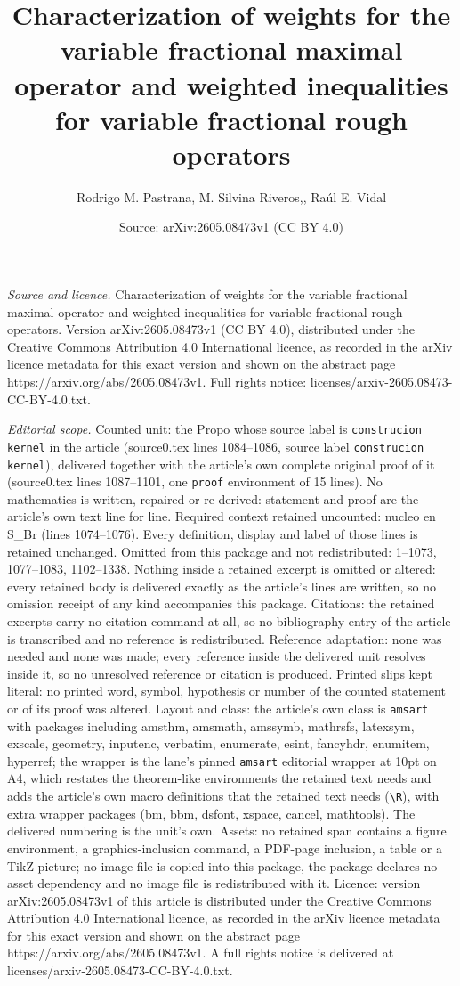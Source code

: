 \documentclass[10pt,a4paper]{amsart}
\title[Characterization of weights for the variable fractional maxi]{Characterization of weights for the variable fractional maximal operator and weighted inequalities for variable fractional rough operators}
\author{Rodrigo M. Pastrana, M. Silvina Riveros,, Ra\'ul E. Vidal}
\date{Source: arXiv:2605.08473v1 (CC BY 4.0)}
\begin{document}
\maketitle

\noindent\emph{Source and licence.} Characterization of weights for the variable fractional maximal operator and weighted inequalities for variable fractional rough operators. Version arXiv:2605.08473v1 (CC BY 4.0), distributed under the Creative Commons Attribution 4.0 International licence, as recorded in the arXiv licence metadata for this exact version and shown on the abstract page https://arxiv.org/abs/2605.08473v1. Full rights notice: licenses/arxiv-2605.08473-CC-BY-4.0.txt.\par\smallskip

\noindent\textit{Editorial scope.} Counted unit: the Propo whose source label is \texttt{construcion kernel} in the article (source0.tex lines 1084--1086, source label \texttt{construcion kernel}), delivered together with the article's own complete original proof of it (source0.tex lines 1087--1101, one \texttt{proof} environment of 15 lines). No mathematics is written, repaired or re-derived: statement and proof are the article's own text line for line. Required context retained uncounted: nucleo en S\_Br (lines 1074--1076). Every definition, display and label of those lines is retained unchanged. Omitted from this package and not redistributed: 1--1073, 1077--1083, 1102--1338. Nothing inside a retained excerpt is omitted or altered: every retained body is delivered exactly as the article's lines are written, so no omission receipt of any kind accompanies this package. Citations: the retained excerpts carry no citation command at all, so no bibliography entry of the article is transcribed and no reference is redistributed. Reference adaptation: none was needed and none was made; every reference inside the delivered unit resolves inside it, so no unresolved reference or citation is produced. Printed slips kept literal: no printed word, symbol, hypothesis or number of the counted statement or of its proof was altered. Layout and class: the article's own class is \texttt{amsart} with packages including amsthm, amsmath, amssymb, mathrsfs, latexsym, exscale, geometry, inputenc, verbatim, enumerate, esint, fancyhdr, enumitem, hyperref; the wrapper is the lane's pinned \texttt{amsart} editorial wrapper at 10pt on A4, which restates the theorem-like environments the retained text needs and adds the article's own macro definitions that the retained text needs (\texttt{\textbackslash R}), with extra wrapper packages (bm, bbm, dsfont, xspace, cancel, mathtools). The delivered numbering is the unit's own. Assets: no retained span contains a figure environment, a graphics-inclusion command, a PDF-page inclusion, a table or a TikZ picture; no image file is copied into this package, the package declares no asset dependency and no image file is redistributed with it. Licence: version arXiv:2605.08473v1 of this article is distributed under the Creative Commons Attribution 4.0 International licence, as recorded in the arXiv licence metadata for this exact version and shown on the abstract page https://arxiv.org/abs/2605.08473v1. A full rights notice is delivered at licenses/arxiv-2605.08473-CC-BY-4.0.txt. 
\end{document}
